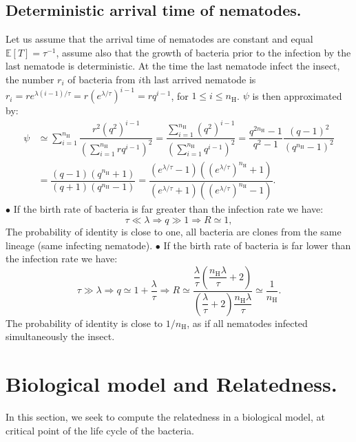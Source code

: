 \documentclass{article}
\newcommand{\nN}{{n_\textrm{H}}}
\begin{document}
  \subsection{Deterministic arrival time of nematodes.}
 Let us assume that the arrival time of nematodes are constant and equal $\mathbb{E}[T]=\tau^{-1}$, assume also that the growth of bacteria prior to the infection by the last nematode is deterministic. At the time the last nematode infect the insect, the number $r_i$ of bacteria from $i$th last arrived nematode is $r_i=r e^{\lambda  (i-1)/ \tau}=r (e^{ \lambda / \tau })^{i-1}=r q^{i-1}$, for $ 1 \leq i \leq \nN$.
 $\psi$ is then approximated by: 
 \begin{align}
  \psi &\simeq \displaystyle \sum_{i=1}^\nN \dfrac{  r^2 (q^2)^{i-1}}{\left(\sum_{i=1}^\nN r q^{i-1}\right)^2} = \dfrac{ \sum_{i=1}^\nN (q^2)^{i-1}}{\left(\sum_{i=1}^\nN q^{i-1}\right)^2}= \dfrac{q^{2\nN} -1 }{q^{2} -1 } \dfrac{(q-1)^2}{(q^\nN -1)^2} \\
  &= \dfrac{(q-1)(q^\nN +1)}{(q+1)(q^\nN -1)} = \dfrac{(e^{  \lambda / \tau}-1)((e^{\lambda / \tau})^\nN +1)}{(e^{\lambda / \tau}+1)((e^{\lambda / \tau})^\nN -1)}. \label{psi}
 \end{align}
 $\bullet$ If the birth rate of bacteria is far greater than the infection rate we have:
 \begin{equation}
 \tau \ll \lambda \Rightarrow q \gg 1 \Rightarrow R \simeq 1,
 \end{equation}
 The probability of identity is close to one, all bacteria are clones from the same lineage (same infecting nematode).
 $\bullet$ If the birth rate of bacteria is far lower than the infection rate we have:
 \begin{equation}
 \tau \gg \lambda \Rightarrow q \simeq 1 + \frac{\lambda }{\tau } \Rightarrow R \simeq 
  \dfrac{\dfrac{\lambda}{\tau}\left( \dfrac{\nN\lambda}{\tau} +2\right)}{\left( \dfrac{\lambda}{\tau} +2\right)\dfrac{\nN\lambda}{\tau}} \simeq \dfrac{1}{\nN}.
 \end{equation}
 The probability of identity is close to $1/ \nN$, as if all nematodes infected simultaneously the insect.
\section{Biological model and Relatedness.}
\label{section_life_cycle}
In this section, we seek to compute the relatedness in a biological model, at critical point of the life cycle of the bacteria.
\end{document}
